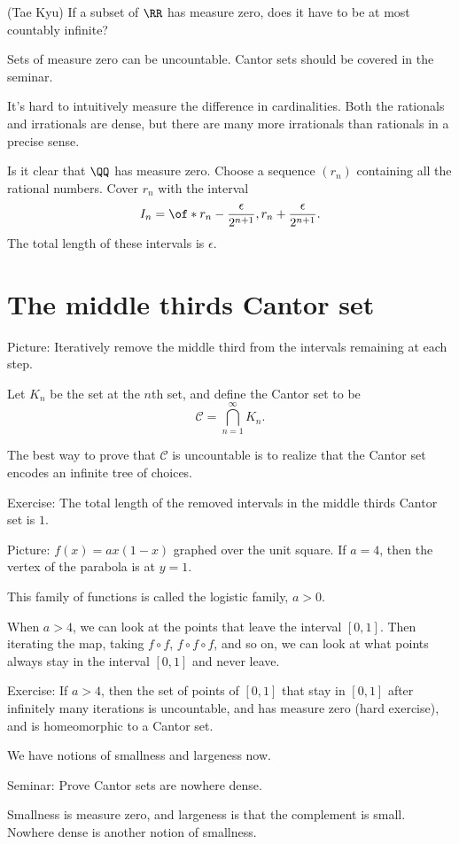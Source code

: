 \documentclass{article}
\begin{document}
(Tae Kyu) If a subset of $\RR$ has measure zero, does it have
to be at most countably infinite?

Sets of measure zero can be uncountable. 
Cantor sets should be covered in the seminar.

It's hard to intuitively measure the difference in cardinalities.
Both the rationals and irrationals are dense, but there are many
more irrationals than rationals in a precise sense. 

Is it clear that $\QQ$ has measure zero.
Choose a sequence $(r_n)$ containing all the rational numbers.
Cover $r_n$ with the interval 
\[ I_n = \of*{r_n-\frac{\epsilon}{2^{n+1}}, r_n + \frac{\epsilon}{2^{n+1}}}. \]
The total length of these intervals is $\epsilon$.

\section{The middle thirds Cantor set}

Picture: Iteratively remove the middle third from the intervals 
remaining at each step.

Let $K_n$ be the set at the $n$th set, and define the
Cantor set to be
\[ \mathscr{C} = \bigcap_{n=1}^\infty K_n. \]

The best way to prove that $\mathscr{C}$ is uncountable is to
realize that the Cantor set encodes an infinite tree of choices.

Exercise: The total length of the removed intervals in
the middle thirds Cantor set is $1$.

Picture: $f(x)=ax(1-x)$ graphed over the unit square. 
If $a=4$, then the vertex of the parabola is at $y=1$. 

This family of functions is called the logistic family, $a>0$.

When $a>4$, we can look at the points that leave the interval 
$[0,1]$. Then iterating the map, taking $f\circ f$, 
$f\circ f \circ f$, and so on, we can look at what points 
always stay in the interval $[0,1]$ and never leave.

Exercise: If $a>4$, then the set of points of $[0,1]$ that
stay in $[0,1]$ after infinitely many iterations is uncountable,
and has measure zero (hard exercise), 
and is homeomorphic to a Cantor set.

We have notions of smallness and largeness now. 

Seminar: Prove Cantor sets are nowhere dense.

Smallness is measure zero, and largeness is that the complement
is small. Nowhere dense is another notion of smallness.
\end{document}
